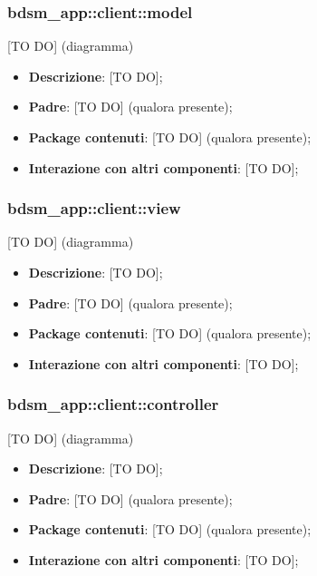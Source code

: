 	\subsubsection{bdsm\_app::client::model} %
	\label{ssub:bdsm_app_client_model}
	[TO DO] (diagramma) \newline \newline

	\begin{itemize}
		\item \textbf{Descrizione}: [TO DO];
		\item \textbf{Padre}: [TO DO] (qualora presente);
		\item \textbf{Package contenuti}: [TO DO] (qualora presente);
		\item \textbf{Interazione con altri componenti}: [TO DO];
	\end{itemize}

	\subsubsection{bdsm\_app::client::view} %
	\label{ssub:bdsm_app_client_view}
	[TO DO] (diagramma) \newline \newline

	\begin{itemize}
		\item \textbf{Descrizione}: [TO DO];
		\item \textbf{Padre}: [TO DO] (qualora presente);
		\item \textbf{Package contenuti}: [TO DO] (qualora presente);
		\item \textbf{Interazione con altri componenti}: [TO DO];
	\end{itemize}

	\subsubsection{bdsm\_app::client::controller} %
	\label{ssub:bdsm_app_client_controller}
	[TO DO] (diagramma) \newline \newline

	\begin{itemize}
		\item \textbf{Descrizione}: [TO DO];
		\item \textbf{Padre}: [TO DO] (qualora presente);
		\item \textbf{Package contenuti}: [TO DO] (qualora presente);
		\item \textbf{Interazione con altri componenti}: [TO DO];
	\end{itemize}


